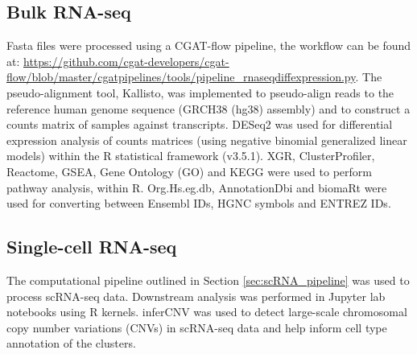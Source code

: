 \subsection{Bulk RNA-seq}\label{subsec:bulk_data_pro}
Fasta files were processed using a CGAT-flow\cite{sims2014cgat} pipeline, the workflow can be found at: \url{https://github.com/cgat-developers/cgat-flow/blob/master/cgatpipelines/tools/pipeline_rnaseqdiffexpression.py}.
The pseudo-alignment tool, Kallisto\cite{bray2016near}, was implemented to pseudo-align reads to the reference human genome sequence (GRCH38 (hg38) assembly) and to construct a counts matrix of samples against transcripts.
DESeq2\cite{love2014moderated} was used for differential expression analysis of  counts  matrices  (using  negative  binomial  generalized  linear  models) within the R statistical framework (v3.5.1).
XGR\cite{fang2016xgr}, ClusterProfiler\cite{yu2012clusterprofiler,wu2021clusterprofiler}, Reactome\cite{fabregat2017reactome}, GSEA\cite{shi2007gene}, Gene Ontology (GO)\cite{gene2019gene} and KEGG\cite{kanehisa2017kegg} were used to perform pathway analysis, within R\@.
Org.Hs.eg.db\cite{carlson2019org}, AnnotationDbi\cite{pages2020annotationdbi} and biomaRt\cite{durinck2009mapping} were used for converting between Ensembl IDs, HGNC symbols and ENTREZ IDs.

\subsection{Single-cell RNA-seq}
The computational pipeline outlined in Section \ref{sec:scRNA_pipeline} was used to process scRNA-seq data.
Downstream analysis was performed in Jupyter lab notebooks\cite{Kluyver2016jupyter} using R kernels.
inferCNV\cite{patel2014single, infercnv2014} was used to detect large-scale chromosomal copy number variations (CNVs) in scRNA-seq data and help inform cell type annotation of the clusters.
